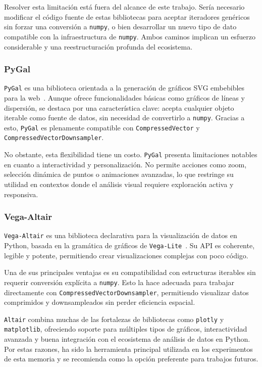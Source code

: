 Resolver esta limitación está fuera del alcance de este trabajo. Sería necesario modificar el código fuente de estas bibliotecas para aceptar iteradores genéricos sin forzar una conversión a \texttt{numpy}, o bien desarrollar un nuevo tipo de dato compatible con la infraestructura de \texttt{numpy}. Ambos caminos implican un esfuerzo considerable y una reestructuración profunda del ecosistema.

\subsubsection{PyGal}

\texttt{PyGal} es una biblioteca orientada a la generación de gráficos SVG embebibles para la web~\cite{pygal}. Aunque ofrece funcionalidades básicas como gráficos de líneas y dispersión, se destaca por una característica clave: acepta cualquier objeto iterable como fuente de datos, sin necesidad de convertirlo a \texttt{numpy}. Gracias a esto, \texttt{PyGal} es plenamente compatible con \texttt{CompressedVector} y \texttt{CompressedVectorDownsampler}.

No obstante, esta flexibilidad tiene un costo. \texttt{PyGal} presenta limitaciones notables en cuanto a interactividad y personalización. No permite acciones como zoom, selección dinámica de puntos o animaciones avanzadas, lo que restringe su utilidad en contextos donde el análisis visual requiere exploración activa y responsiva.

\subsubsection{Vega-Altair}

\texttt{Vega-Altair} es una biblioteca declarativa para la visualización de datos en Python, basada en la gramática de gráficos de \texttt{Vega-Lite}~\cite{altair}. Su API es coherente, legible y potente, permitiendo crear visualizaciones complejas con poco código.

Una de sus principales ventajas es su compatibilidad con estructuras iterables sin requerir conversión explícita a \texttt{numpy}. Esto la hace adecuada para trabajar directamente con \texttt{CompressedVectorDownsampler}, permitiendo visualizar datos comprimidos y downsampleados sin perder eficiencia espacial.

\texttt{Altair} combina muchas de las fortalezas de bibliotecas como \texttt{plotly} y \texttt{matplotlib}, ofreciendo soporte para múltiples tipos de gráficos, interactividad avanzada y buena integración con el ecosistema de análisis de datos en Python. Por estas razones, ha sido la herramienta principal utilizada en los experimentos de esta memoria y se recomienda como la opción preferente para trabajos futuros.


